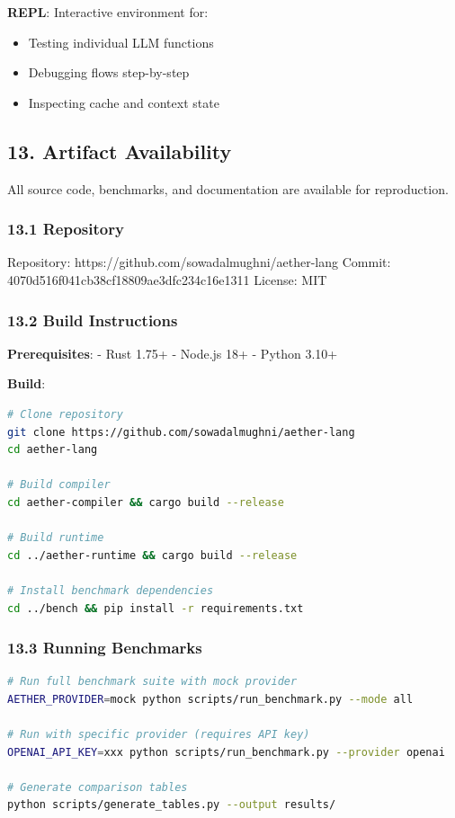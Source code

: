 \documentclass[
]{article}
\providecommand{\tightlist}{%
  \setlength{\itemsep}{0pt}\setlength{\parskip}{0pt}}
\begin{document}
\textbf{REPL}: Interactive environment for:

\begin{itemize}
\tightlist
\item
  Testing individual LLM functions
\item
  Debugging flows step-by-step
\item
  Inspecting cache and context state
\end{itemize}

\subsection{13. Artifact Availability}\label{artifact-availability}

All source code, benchmarks, and documentation are available for
reproduction.

\subsubsection{13.1 Repository}\label{repository}

Repository: https://github.com/sowadalmughni/aether-lang Commit:
4070d516f041cb38cf18809ae3dfc234c16e1311 License: MIT

\subsubsection{13.2 Build Instructions}\label{build-instructions}

\textbf{Prerequisites}: - Rust 1.75+ - Node.js 18+ - Python 3.10+

\textbf{Build}:

\begin{lstlisting}[language=bash]
# Clone repository
git clone https://github.com/sowadalmughni/aether-lang
cd aether-lang

# Build compiler
cd aether-compiler && cargo build --release

# Build runtime
cd ../aether-runtime && cargo build --release

# Install benchmark dependencies
cd ../bench && pip install -r requirements.txt
\end{lstlisting}

\subsubsection{13.3 Running Benchmarks}\label{running-benchmarks}

\begin{lstlisting}[language=bash]
# Run full benchmark suite with mock provider
AETHER_PROVIDER=mock python scripts/run_benchmark.py --mode all

# Run with specific provider (requires API key)
OPENAI_API_KEY=xxx python scripts/run_benchmark.py --provider openai

# Generate comparison tables
python scripts/generate_tables.py --output results/
\end{lstlisting}
\end{document}
